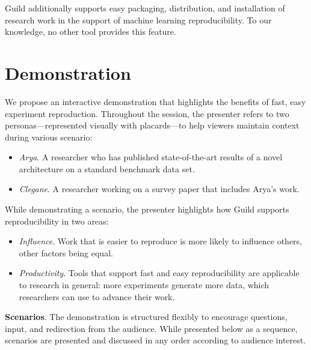 \documentclass{article}
\begin{document}
Guild additionally supports easy packaging, distribution, and
installation of research work in the support of machine learning
reproducibility. To our knowledge, no other tool provides this
feature.

\section{Demonstration}

We propose an interactive demonstration that highlights the benefits
of fast, easy experiment reproduction. Throughout the session, the
presenter refers to two personas---represented visually with
placards---to help viewers maintain context during various scenario:

\begin{itemize}[topsep=0pt, itemsep=0pt]
\item \emph{Arya}. A researcher who has published state-of-the-art
  results of a novel architecture on a standard benchmark data set.
\item \emph{Clegane}. A researcher working on a survey paper that
  includes Arya's work.
\end{itemize}

While demonstrating a scenario, the presenter highlights how Guild
supports reproducibility in two areas:

\begin{itemize}[topsep=0pt, itemsep=0pt]
\item \emph{Influence}. Work that is easier to reproduce is more
  likely to influence others, other factors being equal.

\item \emph{Productivity}. Tools that support fast and easy
  reproducibility are applicable to research in general: more
  experiments generate more data, which researchers can use to advance
  their work.
\end{itemize}

\textbf{Scenarios}. The demonstration is structured flexibly to
encourage questions, input, and redirection from the audience. While
presented below as a sequence, scenarios are presented and discussed
in any order according to audience interest.
\end{document}
